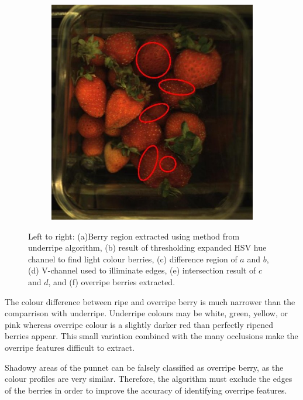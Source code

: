 \documentclass[fleqn,twoside,12pt]{report}
\begin{document}
\begin{figure}[ht]
\begin{subfigure}{.30\textwidth}
		\caption{}
		\label{fig:over_light_diff}
	\end{subfigure}%
	\begin{subfigure}{.30\textwidth}
		\centering
		\includegraphics[width=.9\linewidth]{over_result.jpg}
		\caption{}
		\label{fig:over_result}
	\end{subfigure}%
	
	\caption{Left to right: (a)Berry region extracted using method from underripe algorithm, (b) result of thresholding expanded HSV hue channel to find light colour berries, (c) difference region of $a$ and $b$, (d) V-channel used to illiminate edges,  (e) intersection result of $c$ and $d$, and (f) overripe berries extracted.}
	\label{fig:overripe_process}
\end{figure} 

The colour difference between ripe and overripe berry is much narrower than the comparrison with underripe. Underripe colours may be white, green, yellow, or pink whereas overripe colour is a slightly darker red than perfectly ripened berries appear. This small variation combined with the many occlusions make the overripe features difficult to extract.

Shadowy areas of the punnet can be falsely classified as overripe berry, as the colour profiles are very similar. Therefore, the algorithm must exclude the edges of the berries in order to improve the accuracy of identifying overripe features. 
\end{document}
